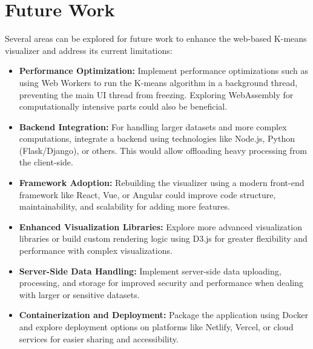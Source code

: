 \documentclass[12pt]{report}
\begin{document}
\section{Future Work}
Several areas can be explored for future work to enhance the web-based K-means visualizer and address its current limitations:
\begin{itemize}
    \item \textbf{Performance Optimization:} Implement performance optimizations such as using Web Workers to run the K-means algorithm in a background thread, preventing the main UI thread from freezing. Exploring WebAssembly for computationally intensive parts could also be beneficial.
    \item \textbf{Backend Integration:} For handling larger datasets and more complex computations, integrate a backend using technologies like Node.js, Python (Flask/Django), or others. This would allow offloading heavy processing from the client-side.
    \item \textbf{Framework Adoption:} Rebuilding the visualizer using a modern front-end framework like React, Vue, or Angular could improve code structure, maintainability, and scalability for adding more features.
    \item \textbf{Enhanced Visualization Libraries:} Explore more advanced visualization libraries or build custom rendering logic using D3.js for greater flexibility and performance with complex visualizations.
    \item \textbf{Server-Side Data Handling:} Implement server-side data uploading, processing, and storage for improved security and performance when dealing with larger or sensitive datasets.
    \item \textbf{Containerization and Deployment:} Package the application using Docker and explore deployment options on platforms like Netlify, Vercel, or cloud services for easier sharing and accessibility.
\end{itemize}

\nocite{*}


\end{document}
